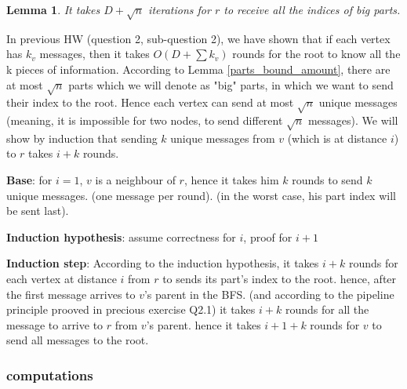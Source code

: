 \documentclass[11pt]{article}
\newtheorem{lemma}[theorem]{Lemma}
\begin{document}



\begin{lemma}
 It takes $D + \sqrt{n}$ iterations for $r$ to receive all the indices of big parts.
\end{lemma}
In previous HW (question 2, sub-question 2), we have shown that if each vertex has $k_v$ messages, then it takes $O(D+\sum{k_v})$ rounds for the root to know all the k pieces of information.
According to Lemma \ref{parts_bound_amount}, there are at most $\sqrt{n}$ parts which we will denote as "big" parts, in which we want to send their index to the root. Hence each vertex can send at most $\sqrt{n}$ unique messages (meaning, it is impossible for two nodes, to send different $\sqrt{n}$ messages). We will show by induction that sending $k$ unique messages from $v$ (which is at distance $i$) to $r$ takes $i + k$ rounds.

\textbf{Base}: for $i=1$, $v$ is a neighbour of $r$, hence it takes him $k$ rounds to send $k$ unique messages. (one message per round). (in the worst case, his part index will be sent last).

\textbf{Induction hypothesis}: assume correctness for $i$, proof for $i+1$

\textbf{Induction step}: According to the induction hypothesis, it takes $i + k$ rounds for each vertex at distance $i$ from $r$ to sends its part's index to the root. hence, after the first message arrives to $v$'s parent in the BFS. (and according to the pipeline principle prooved in precious exercise Q2.1) it takes $i + k$ rounds for all the message to arrive to $r$ from $v$'s parent. hence it takes $i+ 1 + k$ rounds for $v$ to send all messages to the root.

\subsubsection*{computations}
\end{document}
